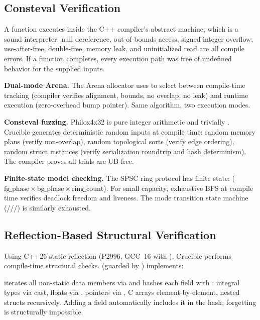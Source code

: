 \subsection{Consteval Verification}

A  function executes inside the C++ compiler's abstract machine, which is a sound interpreter: null dereference, out-of-bounds access, signed integer overflow, use-after-free, double-free, memory leak, and uninitialized read are all compile errors.
If a  function completes, every execution path was free of undefined behavior for the supplied inputs.

\textbf{Dual-mode Arena.}
The Arena allocator uses  to select between compile-time tracking (compiler verifies alignment, bounds, no overlap, no leak) and runtime execution (zero-overhead bump pointer).
Same algorithm, two execution modes.

\textbf{Consteval fuzzing.}
Philox4x32 is pure integer arithmetic and trivially .
Crucible generates deterministic random inputs at compile time: random memory plans (verify non-overlap), random topological sorts (verify edge ordering), random struct instances (verify serialization roundtrip and hash determinism).
The compiler proves all trials are UB-free.

\textbf{Finite-state model checking.}
The SPSC ring protocol has finite state: ($\text{fg\_phase} \times \text{bg\_phase} \times \text{ring\_count}$).
For small capacity, exhaustive BFS at compile time verifies deadlock freedom and liveness.
The mode transition state machine (///) is similarly exhausted.

\subsection{Reflection-Based Structural Verification}

Using C++26 static reflection (P2996, GCC~16 with ), Crucible performs compile-time structural checks.
 (guarded by ) implements:

 iterates all non-static data members via  and hashes each field with : integral types via cast, floats via , pointers via , C arrays element-by-element, nested structs recursively.
Adding a field automatically includes it in the hash; forgetting is structurally impossible.

